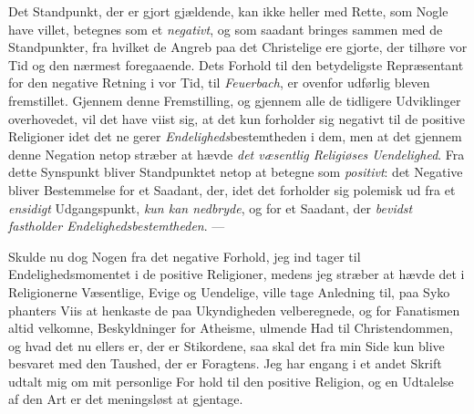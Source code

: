 \begin{enumerate}[label=\arabic*., leftmargin=*, labelsep=1em,
                  topsep=0.35\baselineskip, itemsep=0.35\baselineskip]
  Det Standpunkt, der er gjort gjældende, kan ikke heller med Rette, som Nogle
  have villet, betegnes som et \emph{negativt}, og som saadant bringes sammen med
  de Standpunkter, fra hvilket de Angreb paa det Christelige ere gjorte, der
  tilhøre vor Tid og den nærmest foregaaende. Dets Forhold til den betydeligste
  Repræsentant for den negative Retning i vor Tid, til \emph{Feuerbach}, er
  ovenfor udførlig bleven fremstillet. Gjennem denne Fremstilling, og gjennem
  alle de tidligere Udviklinger overhovedet, vil det have viist sig, at det kun
  forholder sig negativt til de positive Religioner idet det ne\-%
gerer \emph{Endeligheds}bestemtheden i dem, men at det gjennem denne Negation
  netop stræber at hævde \emph{det væsentlig Religiøses Uendelighed}. Fra dette
  Synspunkt bliver Standpunktet netop at betegne som \emph{positivt}: det
  Negative
 bliver Bestemmelse for et Saadant, der, idet det forholder sig polemisk ud fra et
  \emph{ensidigt} Udgangspunkt, \emph{kun kan nedbryde}, og for et Saadant, der
  \emph{bevidst fastholder Endelighedsbestemtheden}. ---

  Skulde nu dog Nogen fra det negative Forhold, jeg ind\-%
tager til Endelighedsmomentet i de positive Religioner, medens jeg stræber at
  hævde det i Religionerne Væsentlige, Evige og Uendelige, ville tage Anledning
  til, paa Syko\-%
phanters Viis at henkaste de paa Ukyndigheden velberegnede, og for Fanatismen
  altid velkomne, Beskyldninger for Atheisme, ulmende Had til Christendommen, og
  hvad det nu ellers er, der er Stikordene, saa skal det fra min Side kun blive
  besvaret med den Taushed, der er Foragtens. Jeg har engang i et andet Skrift
  udtalt mig om mit personlige For\-%
hold til den positive Religion, og en Udtalelse af den Art er det meningsløst at
  gjentage.
\end{enumerate}

